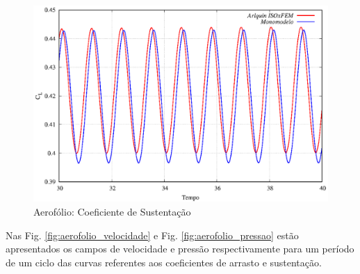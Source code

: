 \documentclass[tese_patricia]{subfiles}
\begin{document}
\begin{figure}[htb!]
	\centering 
	\includegraphics[scale=1.0,trim=0cm 0cm 0cm 0cm, clip=true]{Imagens/Cap6/aerofolio_CL.eps}	
	\caption{Aerofólio: Coeficiente de Sustentação}
	\label{fig:aerofolio_CL}
\end{figure}

Nas Fig. \ref{fig:aerofolio_velocidade} e Fig. \ref{fig:aerofolio_pressao} estão apresentados os campos de velocidade e pressão respectivamente para um período de um ciclo das curvas referentes aos coeficientes de arrasto e sustentação. 
\end{document}
